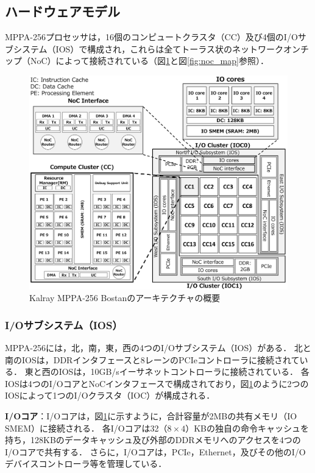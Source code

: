 \documentclass[submit,techrep]{ipsj_v2/UTF8/ipsj}
\begin{document}
\subsection{ハードウェアモデル}
\label{sec:hardware_model}
MPPA-256プロセッサは，16個のコンピュートクラスタ（CC）及び4個のI/Oサブシステム（IOS）で構成され，これらは全てトーラス状のネットワークオンチップ（NoC）によって接続されている（図\ref{fig:mppa_architecture}と図\ref{fig:noc_map}参照）．

\begin{figure}[t]
  \centering
  \includegraphics[width=1.0\linewidth]{../figure/mppa_architecture.pdf}
  \caption{\label{fig:mppa_architecture}
    Kalray MPPA-256 Bostanのアーキテクチャの概要}
\end{figure}

\setlength{\headheight}{0pt}

\subsubsection{I/Oサブシステム（IOS）}
\label{sec:ios}
MPPA-256には，北，南，東，西の4つのI/Oサブシステム（IOS）がある．
北と南のIOSは，DDRインタフェースと8レーンのPCIeコントローラに接続されている．
東と西のIOSは，10GB/sイーサネットコントローラに接続されている．
各IOSは4つのI/OコアとNoCインタフェースで構成されており，図\ref{fig:mppa_architecture}のように2つのIOSによって1つのI/Oクラスタ（IOC）が構成される．

\textbf{I/Oコア}：I/Oコアは，図\ref{fig:mppa_architecture}に示すように，合計容量が2MBの共有メモリ（IO SMEM）に接続される．
各I/Oコアは32（$ 8 \times 4 $）KBの独自の命令キャッシュを持ち，128KBのデータキャッシュ及び外部のDDRメモリへのアクセスを4つのI/Oコアで共有する．
さらに，I/Oコアは，PCIe，Ethernet，及びその他のI/Oデバイスコントローラ等を管理している．
\end{document}
